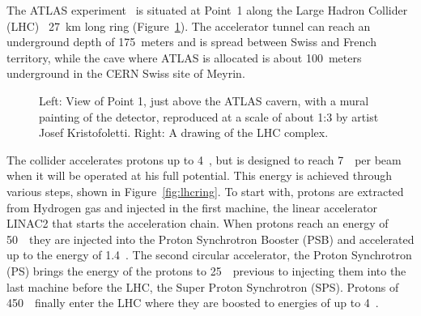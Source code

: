 The ATLAS experiment~\cite{Aad:2008zzm} is situated at Point~1 along the Large Hadron Collider 
(LHC)~\cite{lhc} 27~km long ring (Figure~\ref{fig:nicepics}).
The accelerator
tunnel can reach an underground depth of 175~meters and is spread between Swiss
and French territory, while the cave where ATLAS is allocated is about 100~meters 
underground in the CERN Swiss site of Meyrin.

\begin{figure}[tb]\begin{center}
	\caption[bla]{Left: View of Point 1, just above the ATLAS cavern, with a mural painting 
        of the detector, reproduced at a scale of about 1:3
        by artist Josef Kristofoletti\footnotemark.
        Right: A drawing of the LHC complex.\label{fig:nicepics}}
\end{center}\end{figure}

The collider accelerates protons up to 4~\tev, but is designed to reach 7~\tev\ per beam
when it will be operated at his full potential. This energy is achieved
through various steps, shown in Figure~\ref{fig:lhcring}.
To start with, protons are extracted from Hydrogen gas and injected in the first machine, the linear 
accelerator LINAC2 that starts the acceleration chain. When protons reach
an energy of 50~\mev\ they are injected into the Proton Synchrotron Booster
(PSB) and accelerated up to the energy of 1.4~\gev. The second circular
accelerator, the Proton Synchrotron (PS) brings the energy of the protons
to 25~\gev\ previous to injecting them into the last machine before the LHC,
the Super Proton Synchrotron (SPS). Protons of 450~\gev\ finally enter the
LHC where they are boosted to energies of up to 4~\tev.

